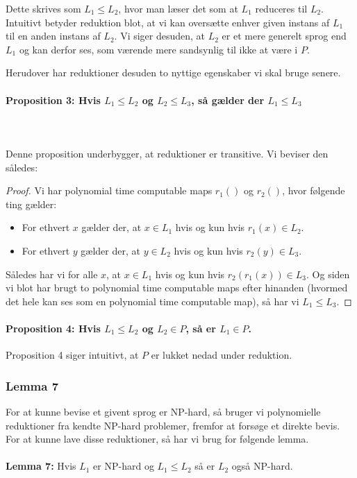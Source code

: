 Dette skrives som $L_1 \leq L_2$, hvor man læser det som at $L_1$ reduceres til
$L_2$. Intuitivt betyder reduktion blot, at vi kan oversætte enhver given
instans af $L_1$ til en anden instans af $L_2$. Vi siger desuden, at $L_2$ er
et mere generelt sprog end $L_1$ og kan derfor ses, som værende mere sandsynlig
til ikke at være i $P$.


Herudover har  reduktioner desuden to nyttige egenskaber vi skal bruge senere.

\paragraph{Proposition 3: Hvis $L_1 \leq L_2$ og $L_2 \leq L_3$, så gælder der
$L_1 \leq L_3$}
~\\
~\\
Denne proposition underbygger, at reduktioner er transitive. Vi beviser den
således:

\begin{proof}
Vi har polynomial time computable maps $r_1()$ og $r_2()$, hvor følgende ting
gælder:

\begin{itemize}
 \item For ethvert $x$ gælder der, at $x \in L_1$ hvis og kun hvis $r_1(x) \in L_2$.
 \item For ethvert $y$ gælder der, at $y \in L_2$ hvis og kun hvis $r_2(y) \in L_3$.
\end{itemize}

Således har vi for alle $x$, at $x \in L_1$ hvis og kun hvis $r_2(r_1(x)) \in
L_3$. Og siden vi blot har brugt to polynomial time computable maps efter
hinanden (hvormed det hele kan ses som en polynomial time computable map), så
har vi $L_1 \leq L_3$.
\end{proof}

\paragraph{Proposition 4: Hvis $L_1 \leq L_2$ og $L_2 \in P$, så er $L_1 \in P$.}

Proposition 4 siger intuitivt, at $P$ er lukket nedad under reduktion. 
\subsubsection{Lemma 7}

For at kunne bevise et givent sprog er NP-hard, så bruger vi  polynomielle
reduktioner fra kendte NP-hard problemer, fremfor at forsøge et direkte bevis.
For at kunne lave disse reduktioner, så har vi brug for følgende lemma.\\
~\\
\textbf{Lemma 7:} Hvis $L_1$ er NP-hard og $L_1 \leq L_2$ så er $L_2$ også
NP-hard.

